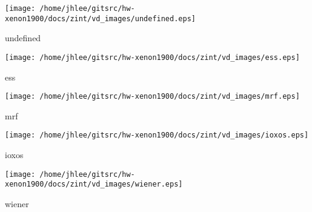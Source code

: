 \noindent
\vspace{1.4cm}
\begin{minipage}{.2\textwidth}
\begin{center}
\texttt{[image: /home/jhlee/gitsrc/hw-xenon1900/docs/zint/vd\_images/undefined.eps]}
\end{center}
\end{minipage}
\begin{minipage}{.7\textwidth}
undefined
\end{minipage}


\noindent
\vspace{1.4cm}
\begin{minipage}{.2\textwidth}
\begin{center}
\texttt{[image: /home/jhlee/gitsrc/hw-xenon1900/docs/zint/vd\_images/ess.eps]}
\end{center}
\end{minipage}
\begin{minipage}{.7\textwidth}
ess
\end{minipage}


\noindent
\vspace{1.4cm}
\begin{minipage}{.2\textwidth}
\begin{center}
\texttt{[image: /home/jhlee/gitsrc/hw-xenon1900/docs/zint/vd\_images/mrf.eps]}
\end{center}
\end{minipage}
\begin{minipage}{.7\textwidth}
mrf
\end{minipage}


\noindent
\vspace{1.4cm}
\begin{minipage}{.2\textwidth}
\begin{center}
\texttt{[image: /home/jhlee/gitsrc/hw-xenon1900/docs/zint/vd\_images/ioxos.eps]}
\end{center}
\end{minipage}
\begin{minipage}{.7\textwidth}
ioxos
\end{minipage}


\noindent
\vspace{1.4cm}
\begin{minipage}{.2\textwidth}
\begin{center}
\texttt{[image: /home/jhlee/gitsrc/hw-xenon1900/docs/zint/vd\_images/wiener.eps]}
\end{center}
\end{minipage}
\begin{minipage}{.7\textwidth}
wiener
\end{minipage}


